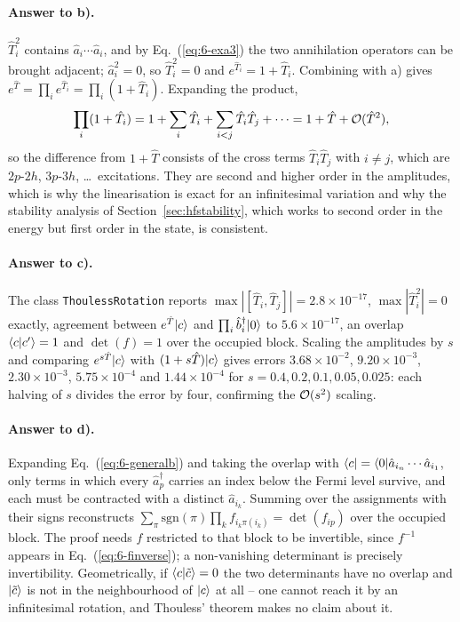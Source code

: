 \paragraph{Answer to b).}
$\hat{T}_i^2$ contains $\hat{a}_{i}\cdots\hat{a}_{i}$, and by
Eq.~(\ref{eq:6-exa3}) the two annihilation operators can be brought adjacent;
$\hat{a}_i^2=0$, so $\hat{T}_i^2=0$ and $e^{\hat{T}_i}=1+\hat{T}_i$.
Combining with a) gives
$e^{\hat{T}}=\prod_i e^{\hat{T}_i}=\prod_i(1+\hat{T}_i)$.  Expanding the
product,
\begin{equation}
  \prod_i(1+\hat{T}_i) = 1 + \sum_i\hat{T}_i
    + \sum_{i<j}\hat{T}_i\hat{T}_j + \cdots
    = 1 + \hat{T} + \mathcal{O}(\hat{T}^2),
  \label{eq:6-exb4}
\end{equation}
so the difference from $1+\hat{T}$ consists of the cross terms
$\hat{T}_i\hat{T}_j$ with $i\ne j$, which are $2p$-$2h$, $3p$-$3h$, \dots\
excitations.  They are second and higher order in the amplitudes, which is
why the linearisation is exact for an infinitesimal variation and why the
stability analysis of Section~\ref{sec:hfstability}, which works to second
order in the energy but first order in the state, is consistent.

\paragraph{Answer to c).}
The class \texttt{ThoulessRotation} reports
$\max|[\hat{T}_i,\hat{T}_j]|=2.8\times10^{-17}$,
$\max|\hat{T}_i^2|=0$ exactly, agreement between $e^{\hat{T}}\vert c \rangle$ and
$\prod_i\hat{b}^{\dagger}_i\vert 0 \rangle$ to $5.6\times10^{-17}$, an overlap
$\langle c \vert c' \rangle=1$ and $\det(f)=1$ over the occupied block.  Scaling the
amplitudes by $s$ and comparing $e^{s\hat{T}}\vert c \rangle$ with
$(1+s\hat{T})\vert c \rangle$ gives errors $3.68\times10^{-2}$,
$9.20\times10^{-3}$, $2.30\times10^{-3}$, $5.75\times10^{-4}$ and
$1.44\times10^{-4}$ for $s=0.4,0.2,0.1,0.05,0.025$: each halving of $s$
divides the error by four, confirming the $\mathcal{O}(s^2)$ scaling.

\paragraph{Answer to d).}
Expanding Eq.~(\ref{eq:6-generalb}) and taking the overlap with
$\langle c \vert=\langle 0 \vert\hat{a}_{i_n}\cdots\hat{a}_{i_1}$, only terms in which every
$\hat{a}^{\dagger}_p$ carries an index below the Fermi level survive, and each
must be contracted with a distinct $\hat{a}_{i_k}$.  Summing over the
assignments with their signs reconstructs
$\sum_{\pi}\mathrm{sgn}(\pi)\prod_k f_{i_k\pi(i_k)}=\det(f_{ip})$ over the
occupied block.  The proof needs $f$ restricted to that block to be
invertible, since $f^{-1}$ appears in Eq.~(\ref{eq:6-finverse}); a
non-vanishing determinant is precisely invertibility.  Geometrically, if
$\langle c \vert \tilde{c} \rangle=0$ the two determinants have no overlap and
$\vert \tilde{c} \rangle$ is not in the neighbourhood of $\vert c \rangle$ at all -- one
cannot reach it by an infinitesimal rotation, and Thouless' theorem makes no
claim about it.

